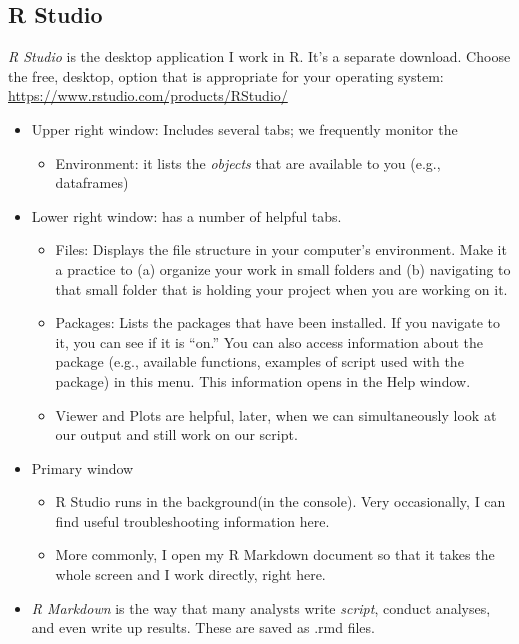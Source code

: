\documentclass[
  11pt,
]{book}
\providecommand{\tightlist}{%
  \setlength{\itemsep}{0pt}\setlength{\parskip}{0pt}}
\begin{document}
\hypertarget{r-studio}{%
\subsection{R Studio}\label{r-studio}}

\emph{R Studio} is the desktop application I work in R. It's a separate download. Choose the free, desktop, option that is appropriate for your operating system: \url{https://www.rstudio.com/products/RStudio/}

\begin{itemize}
\tightlist
\item
  Upper right window: Includes several tabs; we frequently monitor the

  \begin{itemize}
  \tightlist
  \item
    Environment: it lists the \emph{objects} that are available to you (e.g., dataframes)
  \end{itemize}
\item
  Lower right window: has a number of helpful tabs.

  \begin{itemize}
  \tightlist
  \item
    Files: Displays the file structure in your computer's environment. Make it a practice to (a) organize your work in small folders and (b) navigating to that small folder that is holding your project when you are working on it.
  \item
    Packages: Lists the packages that have been installed. If you navigate to it, you can see if it is ``on.'' You can also access information about the package (e.g., available functions, examples of script used with the package) in this menu. This information opens in the Help window.
  \item
    Viewer and Plots are helpful, later, when we can simultaneously look at our output and still work on our script.
  \end{itemize}
\item
  Primary window

  \begin{itemize}
  \tightlist
  \item
    R Studio runs in the background(in the console). Very occasionally, I can find useful troubleshooting information here.
  \item
    More commonly, I open my R Markdown document so that it takes the whole screen and I work directly, right here.
  \end{itemize}
\item
  \emph{R Markdown} is the way that many analysts write \emph{script}, conduct analyses, and even write up results. These are saved as .rmd files.


\end{itemize}
\end{document}
